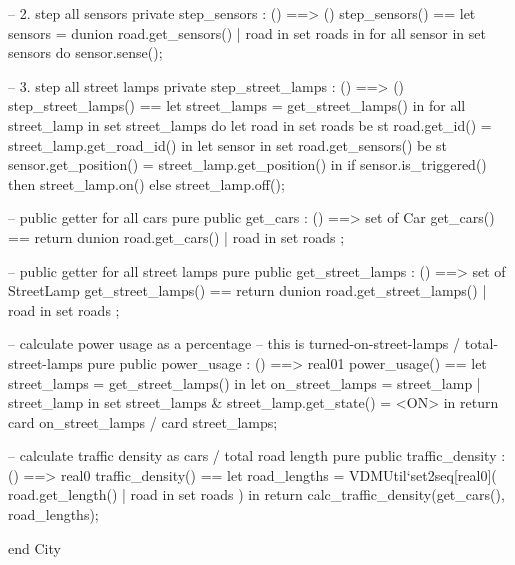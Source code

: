 \documentclass[a4paper]{article}
\begin{document}
\begin{vdm_al}
    -- 2. step all sensors
    private step_sensors : () ==> ()
    step_sensors() ==
        let sensors = dunion {
            road.get_sensors()
            | road in set roads
        } in
            for all sensor in set sensors do
                sensor.sense();

    -- 3. step all street lamps
    private step_street_lamps : () ==> ()
    step_street_lamps() ==
        let street_lamps = get_street_lamps() in
        for all street_lamp in set street_lamps do
            let road in set roads be st road.get_id() = street_lamp.get_road_id() in
            let sensor in set road.get_sensors()
            be st sensor.get_position() = street_lamp.get_position() in
                if sensor.is_triggered() then
                    street_lamp.on()
                else
                    street_lamp.off();

    -- public getter for all cars
    pure public get_cars : () ==> set of Car
    get_cars() ==
        return dunion {
            road.get_cars()
            | road in set roads
        };
    
    -- public getter for all street lamps
    pure public get_street_lamps : () ==> set of StreetLamp
    get_street_lamps() ==
        return dunion {
            road.get_street_lamps()
            | road in set roads
        };

    -- calculate power usage as a percentage
    -- this is turned-on-street-lamps / total-street-lamps
    pure public power_usage : () ==> real01
    power_usage() ==
        let street_lamps = get_street_lamps() in
        let on_street_lamps = {
            street_lamp
            | street_lamp in set street_lamps
            & street_lamp.get_state() = <ON>
        } in
        return card on_street_lamps / card street_lamps;

    -- calculate traffic density as cars / total road length
    pure public traffic_density : () ==> real0
    traffic_density() ==
        let road_lengths = VDMUtil`set2seq[real0]({
            road.get_length()
            | road in set roads
        }) in
        return calc_traffic_density(get_cars(), road_lengths);

end City
\end{vdm_al}
\bigskip
\end{document}
